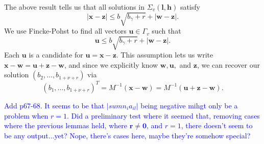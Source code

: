 \documentclass[11pt]{report}
\newtheorem{lemma}[theorem]{Lemma}
\theoremstyle{definition}
\DeclareMathOperator{\ord}{ord}
\newcommand{\edit}[1]{\textcolor{blue}{#1}}
\begin{document}
The above result tells us that all solutions in $\Sigma_v(\mathbf{l},\mathbf{h})$ satisfy
\[|\mathbf{x} - \mathbf{z}| \leq b\sqrt{b_{\gamma} + r} + |\mathbf{w} - \mathbf{z}|.\]
We use Fincke-Pohst to find all vectors $\mathbf{u}\in \Gamma_v$ such that
\[\mathbf{u} \leq b\sqrt{b_{\gamma} + r} + |\mathbf{w} - \mathbf{z}|.\]
Each $\mathbf{u}$ is a candidate for $\mathbf{u} = \mathbf{x} - \mathbf{z}$. This assumption lets us write $\mathbf{x} - \mathbf{w} = \mathbf{u} + \mathbf{z} - \mathbf{w}$, and since we explicitly know $\mathbf{w}, \mathbf{u},$ and $\mathbf{z}$, we can recover our solution $(b_2, \dots, b_{1+\nu+r})$ via
\[(b_1,\dots, b_{1+\nu+r})^T = M^{-1}(\mathbf{x} - \mathbf{w}) = M^{-1}(\mathbf{u} + \mathbf{z} - \mathbf{w}).\]

\edit{Add p67-68}.
\edit{It seems to be that $|sum n_i a_{il}|$ being negative mihgt only be a problem when $r = 1$. Did a preliminary test where it seemed that, removing cases where the previous lemmas held, where $\mathbf{r} \neq \mathbf{0}$, and $r = 1$, there doesn't seem to be any output...yet? Nope, there's cases here, maybe they're somehow special?}









\end{document}
